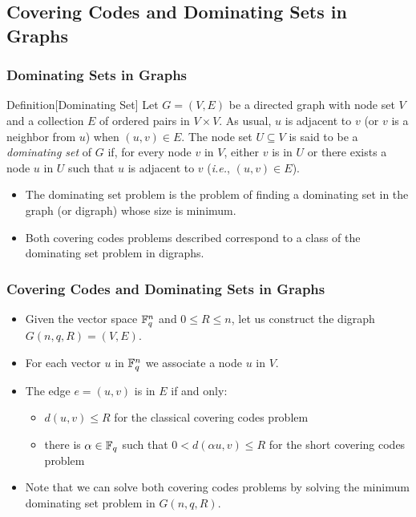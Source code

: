 \documentclass{beamer}
\begin{document}
\subsection{Covering Codes and Dominating Sets in Graphs}

\begin{frame}
  \frametitle{Dominating Sets in Graphs}
{


\begin{block}{Definition}[Dominating Set]
\scriptsize
Let $G=(V,E)$ be a directed graph with node set $V$ and a collection $E$ of ordered pairs in $V\times V$. 
As usual, $u$ is adjacent to $v$ (or $v$ is a neighbor from $u$) when $(u,v) \in E$. The node set $U \subseteq V$
is said to be a {\it dominating set} of $G$ if, for every node $v$ in $V$, either $v$ is in $U$ or there exists a node $u$ in $U$ such that $u$ is adjacent to $v$ ({\em i.e.}, $(u,v) \in E$).
\end{block}
\pause

\begin{itemize}
\item<1-> The dominating set problem is the problem of finding a dominating set in the graph (or digraph) whose size is minimum. 
\item<2-> Both covering codes problems described correspond to a class of the dominating set problem in digraphs.
\end{itemize}

}
\end{frame}


\begin{frame}
  \frametitle{Covering Codes and Dominating Sets in Graphs}
{

\begin{itemize}

\item<1-> Given the vector space $\Bbb{F}_q^n$ and $0 \leq R \leq n$, let us construct the digraph $G(n,q,R)=(V,E)$.
\item<2-> For each vector $u$ in $\Bbb{F}_q^n$ we associate a node $u$ in $V$.
\item<3-> The edge $e=(u,v)$ is in $E$ if and only:
 	\begin{itemize}
 	  \item<4-> $d(u,v) \leq R$ for the classical covering codes problem
 	  \item<5-> there is $\alpha \in \Bbb{F}_q$ such that $0 <d(\alpha u,v) \leq R$ for the short covering codes problem
	\end{itemize}
\item<6-> Note that we can solve both covering codes problems by solving the minimum dominating set problem in $G(n,q,R)$.

\end{itemize}

}
\end{frame}
\end{document}
